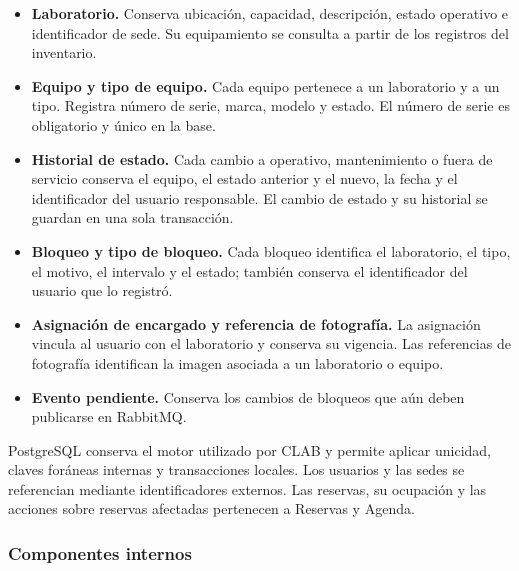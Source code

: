 \begin{itemize}
    \item \textbf{Laboratorio.} Conserva ubicación, capacidad, descripción,
    estado operativo e identificador de sede. Su equipamiento se consulta
    a partir de los registros del inventario.
    \item \textbf{Equipo y tipo de equipo.} Cada equipo pertenece a un
    laboratorio y a un tipo. Registra número de serie, marca, modelo y estado.
    El número de serie es obligatorio y único en la base.
    \item \textbf{Historial de estado.} Cada cambio a operativo, mantenimiento
    o fuera de servicio conserva el equipo, el estado anterior y el nuevo,
    la fecha y el identificador del usuario responsable. El cambio de estado
    y su historial se guardan en una sola transacción.
    \item \textbf{Bloqueo y tipo de bloqueo.} Cada bloqueo identifica el
    laboratorio, el tipo, el motivo, el intervalo y el estado; también
    conserva el identificador del usuario que lo registró.
    \item \textbf{Asignación de encargado y referencia de fotografía.}
    La asignación vincula al usuario con el laboratorio y conserva su
    vigencia. Las referencias de fotografía identifican la imagen asociada
    a un laboratorio o equipo.
    \item \textbf{Evento pendiente.} Conserva los cambios de bloqueos que
    aún deben publicarse en RabbitMQ.
\end{itemize}

PostgreSQL conserva el motor utilizado por CLAB y permite aplicar
unicidad, claves foráneas internas y transacciones locales. Los usuarios
y las sedes se referencian mediante identificadores externos. Las reservas,
su ocupación y las acciones sobre reservas afectadas pertenecen a
Reservas y Agenda.

\subsubsection{Componentes internos}

